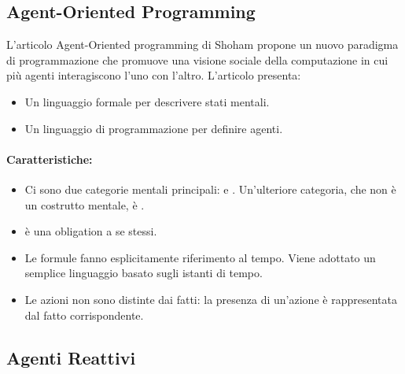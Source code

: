 \subsection{Agent-Oriented Programming}

L'articolo Agent-Oriented programming di Shoham propone un nuovo paradigma di programmazione che promuove una visione sociale della computazione in cui più agenti interagiscono l'uno con l'altro. L'articolo presenta:
\begin{itemize}
  \item Un linguaggio formale per descrivere stati mentali. 
  \item Un linguaggio di programmazione per definire agenti. 
\end{itemize}

\paragraph{Caratteristiche:}

\begin{itemize}
  \item Ci sono due categorie mentali principali:  e . Un'ulteriore categoria, che non è un costrutto mentale, è . 
  \item {} è una obligation a se stessi. 
  \item Le formule fanno esplicitamente riferimento al tempo. Viene adottato un semplice linguaggio basato sugli istanti di tempo. 
  \item Le azioni non sono distinte dai fatti: la presenza di un'azione è rappresentata dal fatto corrispondente.
\end{itemize}


\subsection{Agenti Reattivi}


